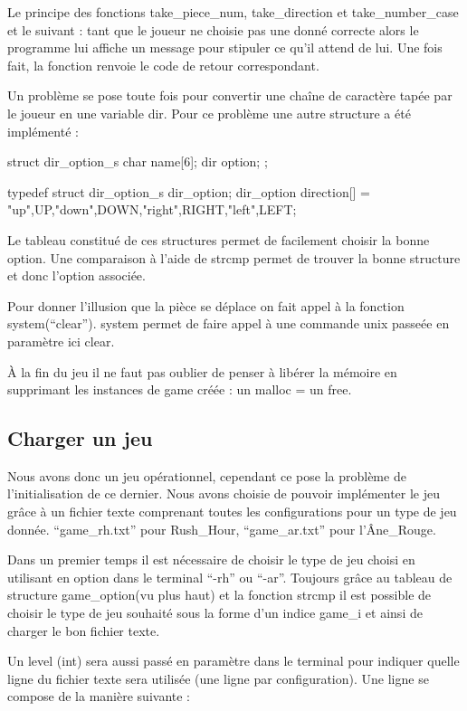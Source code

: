 \documentclass{report}
\begin{document}
Le principe des fonctions take\_piece\_num, take\_direction et take\_number\_case et le suivant : tant que le joueur ne choisie pas une donné correcte alors le programme lui affiche un message pour stipuler ce qu'il attend de lui. Une fois fait, la fonction renvoie le code de retour correspondant.

Un problème se pose toute fois pour convertir une chaîne de caractère tapée par le joueur en une variable dir. Pour ce problème une autre structure a été implémenté :

\begin{verbatimtab}[10]
struct dir_option_s{
      char name[6];
      dir option;
};

typedef struct dir_option_s dir_option;
dir_option direction[] = {{"up",UP},{"down",DOWN},{"right",RIGHT},{"left",LEFT}};
\end{verbatimtab}


Le tableau constitué de ces structures permet de facilement choisir la bonne option. Une comparaison à l'aide de strcmp permet de trouver la bonne structure et donc l'option associée.

Pour donner l'illusion que la pièce se déplace on fait appel à la fonction system(``clear'').
system permet de faire appel à une commande unix passeée en paramètre ici clear.

À la fin du jeu il ne faut pas oublier de penser à libérer la mémoire en supprimant les instances de game créée : un malloc = un free.

\subsection{Charger un jeu}
Nous avons donc un jeu opérationnel, cependant ce pose la problème de l'initialisation de ce dernier. Nous avons choisie de pouvoir implémenter le jeu grâce à un fichier texte comprenant toutes les configurations pour un type de jeu donnée. ``game\_rh.txt'' pour Rush\_Hour, ``game\_ar.txt'' pour l'Âne\_Rouge. 

Dans un premier temps il est nécessaire de choisir le type de jeu choisi en utilisant en option dans le terminal ``-rh'' ou ``-ar''. Toujours grâce au tableau de structure game\_option(vu plus haut) et la fonction strcmp il est possible de choisir le type de jeu souhaité sous la forme d'un indice game\_i et ainsi de charger le bon fichier texte.

Un level (int) sera aussi passé en paramètre dans le terminal pour indiquer quelle ligne du fichier texte sera utilisée (une ligne par configuration). Une ligne se compose de la manière suivante :
\end{document}
